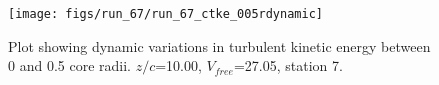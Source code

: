 \begin{figure}[H]
\centering
\texttt{[image: figs/run\_67/run\_67\_ctke\_005rdynamic]}
\caption{Plot showing dynamic variations in turbulent kinetic energy between 0 and 0.5 core radii. $z/c$=10.00, $V_{free}$=27.05, station 7.}
\label{fig:run_67_ctke_005rdynamic}
\end{figure}


